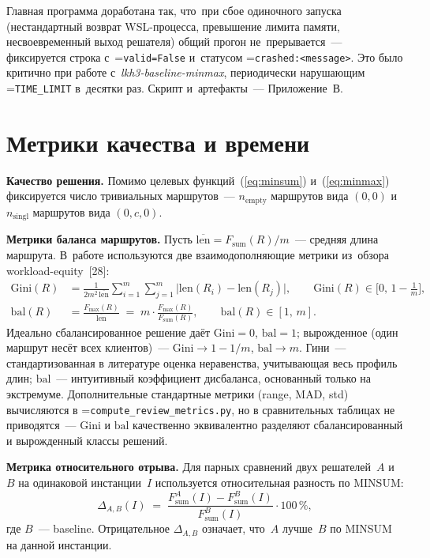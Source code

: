 \documentclass[a4paper,14pt]{extreport}
\makeatletter
\let\old@texttt\texttt
\renewcommand{\texttt}[1]{{\sloppy\hyphenchar\font=\m@ne\old@texttt{#1}}}
\makeatother
\begin{document}
Главная программа доработана так, что~при сбое одиночного запуска (нестандартный возврат WSL-процесса, превышение лимита памяти, несвоевременный выход решателя) общий прогон не~прерывается~--- фиксируется строка с~\texttt{valid=False} и~статусом \texttt{crashed:<message>}. Это было критично при работе с~\emph{lkh3-baseline-minmax}, периодически нарушающим \texttt{TIME\_LIMIT} в~десятки раз. Скрипт и~артефакты~--- Приложение~В.

\section{Метрики качества и времени}

\textbf{Качество решения.} Помимо целевых функций~(\ref{eq:minsum}) и~(\ref{eq:minmax}) фиксируется число тривиальных маршрутов~--- $n_\mathrm{empty}$ маршрутов вида $(0,0)$ и $n_\mathrm{singl}$ маршрутов вида $(0,c,0)$.

\textbf{Метрики баланса маршрутов.} Пусть $\overline{\mathrm{len}}=F_{\mathrm{sum}}(R)/m$~--- средняя длина маршрута. В~работе используются две взаимодополняющие метрики из~обзора workload-equity~[28]:
\begin{align}
\mathrm{Gini}(R) &= \frac{1}{2m^2\,\overline{\mathrm{len}}}\sum_{i=1}^{m}\sum_{j=1}^{m}\bigl|\mathrm{len}(R_i)-\mathrm{len}(R_j)\bigr|,\qquad \mathrm{Gini}(R)\in\bigl[0,\,1-\tfrac{1}{m}\bigr],\label{eq:gini}\\
\mathrm{bal}(R) &= \frac{F_{\max}(R)}{\overline{\mathrm{len}}}\;=\;m\cdot\frac{F_{\max}(R)}{F_{\mathrm{sum}}(R)},\qquad \mathrm{bal}(R)\in[1,\,m].\label{eq:bal}
\end{align}
Идеально сбалансированное решение даёт $\mathrm{Gini}=0$, $\mathrm{bal}=1$; вырожденное (один маршрут несёт всех клиентов)~--- $\mathrm{Gini}\to 1-1/m$, $\mathrm{bal}\to m$. Гини~--- стандартизованная в литературе оценка неравенства, учитывающая весь профиль длин; $\mathrm{bal}$~--- интуитивный коэффициент дисбаланса, основанный только на экстремуме. Дополнительные стандартные метрики (range, MAD, std) вычисляются в \texttt{compute\_review\_metrics.py}, но в сравнительных таблицах не приводятся~--- $\mathrm{Gini}$ и $\mathrm{bal}$ качественно эквивалентно разделяют сбалансированный и вырожденный классы решений.

\textbf{Метрика относительного отрыва.} Для парных сравнений двух решателей~$A$ и~$B$ на одинаковой инстанции~$I$ используется относительная разность по MINSUM:
\begin{equation}
\Delta_{A,B}(I)\;=\;\frac{F_{\mathrm{sum}}^{A}(I)-F_{\mathrm{sum}}^{B}(I)}{F_{\mathrm{sum}}^{B}(I)}\cdot 100\,\%,
\label{eq:delta}
\end{equation}
где $B$~--- baseline. Отрицательное $\Delta_{A,B}$ означает, что~$A$ лучше~$B$ по MINSUM на данной инстанции.
\end{document}
